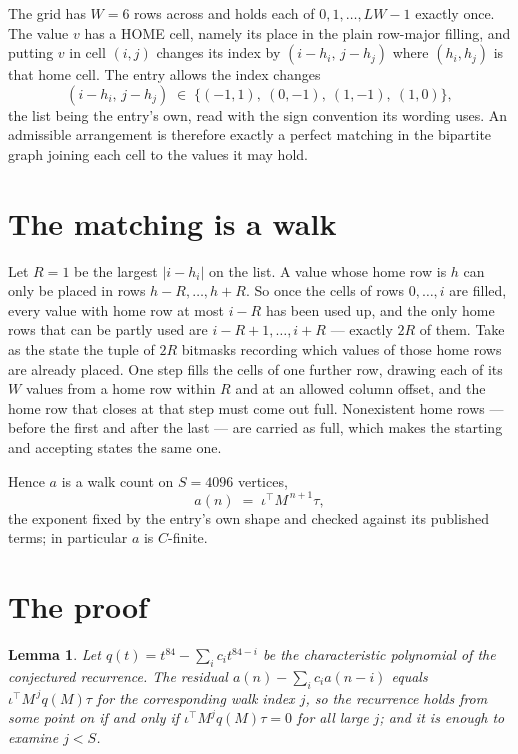 \documentclass[11pt,a4paper]{article}
\theoremstyle{plain}
\newtheorem{lemma}[theorem]{Lemma}
\theoremstyle{definition}
\begin{document}
The grid has $W=6$ rows across and holds each of $0,1,\dots,LW-1$ exactly once. The value
$v$ has a HOME cell, namely its place in the plain row-major filling, and putting $v$ in cell
$(i,j)$ changes its index by $(i-h_i,\,j-h_j)$ where $(h_i,h_j)$ is that home cell. The entry
allows the index changes
\[
(i-h_i,\,j-h_j)\;\in\;\{(-1,1),\ (0,-1),\ (1,-1),\ (1,0)\},
\]
the list being the entry's own, read with the sign convention its wording uses. An admissible
arrangement is therefore exactly a perfect matching in the bipartite graph joining each cell to
the values it may hold.

\section{The matching is a walk}

Let $R=1$ be the largest $|i-h_i|$ on the list. A value whose home row is $h$ can only be
placed in rows $h-R,\dots,h+R$. So once the cells of rows $0,\dots,i$ are filled, every
value with home row at most $i-R$ has been used up, and the only home rows that can be
partly used are $i-R+1,\dots,i+R$ --- exactly $2R$ of them. Take as the state the tuple of
$2R$ bitmasks recording which values of those home rows are already placed. One step fills
the cells of one further row, drawing each of its $W$ values from a home row within $R$
and at an allowed column offset, and the home row that closes at that step must come out
full. Nonexistent home rows --- before the first and after the last --- are carried as
full, which makes the starting and accepting states the same one.

Hence $a$ is a walk count on $S=4096$ vertices,
\[
a(n)\;=\;\iota^{\!\top}M^{\,n+1}\tau ,
\]
the exponent fixed by the entry's own shape and checked against its published terms; in
particular $a$ is $C$-finite.

\section{The proof}

\begin{lemma}\label{lem:crit}
Let $q(t)=t^{84}-\sum_i c_it^{84-i}$ be the characteristic polynomial of the
conjectured recurrence. The residual $a(n)-\sum_ic_ia(n-i)$ equals
$\iota^{\!\top}M^{\,j}q(M)\tau$ for the corresponding walk index $j$, so the recurrence
holds from some point on if and only if $\iota^{\!\top}M^{j}q(M)\tau=0$ for all large $j$;
and it is enough to examine $j<S$.
\end{lemma}
\end{document}
